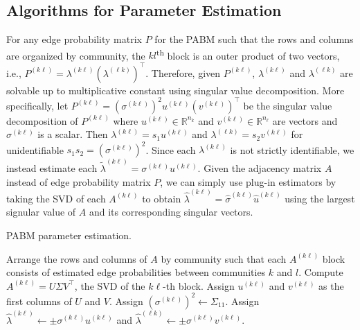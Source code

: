\documentclass[12pt]{article}
\begin{document}
\hypertarget{parameter-estimation}{%
\subsection{Algorithms for Parameter Estimation}\label{parameter-estimation}}

For any edge probability matrix \(P\) for the PABM such that the rows
and columns are organized by community, the \(kl\)\textsuperscript{th}
block is an outer product of two vectors, i.e.,
\(P^{(k \ell)} = \lambda^{(k \ell)} (\lambda^{(\ell k)})^\top\). Therefore, given
\(P^{(k \ell)}\), \(\lambda^{(k \ell)}\) and \(\lambda^{(\ell k)}\) are solvable
up to multiplicative constant using singular value
decomposition. More specifically, 
let \(P^{(k \ell)} = (\sigma^{(k \ell)})^2 u^{(k \ell)} (v^{(k \ell)})^\top\)
be the singular value decomposition of \(P^{(k \ell)}\) where
\(u^{(k \ell)} \in \mathbb{R}^{n_k}\) and 
\(v^{(k \ell)} \in \mathbb{R}^{n_\ell}\) are vectors
and \(\sigma^{(k \ell)}\) is a scalar. 
Then \(\lambda^{(k \ell)} = s_1 u^{(k \ell)}\)
and \(\lambda^{(\ell k)} = s_2 v^{(k \ell)}\) 
for unidentifiable $s_1 s_2 = (\sigma^{(k \ell)})^2$.
Since each $\lambda^{(k \ell)}$ is not strictly identifiable,
we instead estimate each 
$\tilde{\lambda}^{(k \ell)} = \sigma^{(k \ell)} u^{(k \ell)}$. 
Given the adjacency matrix \(A\)
instead of edge probability matrix \(P\), we can simply use plug-in
estimators by taking the SVD of each $A^{(k \ell)}$ to obtain 
$\hat{\lambda}^{(k \ell)} = \hat{\sigma}^{(k \ell)} \hat{u}^{(k \ell)}$ 
using the largest signular value of $A$ and its corresponding singular vectors. 

\begin{algorithm}[t]
  \label{alg:param_est}
  \DontPrintSemicolon
  \SetAlgoLined
  \caption{PABM parameter estimation.}
  Arrange the rows and columns of $A$ by community such that each 
  $A^{(k \ell)}$ block consists of estimated edge probabilities between 
  communities $k$ and $l$.\;
   {
    Compute $A^{(k \ell)} = U \Sigma V^\top$, the SVD of the $k\ell$-th 
    block.\;
    Assign $u^{(k \ell)}$ and $v^{(k \ell)}$ as the first columns of $U$ and $V$. 
    Assign $(\sigma^{(k \ell)})^2 \leftarrow \Sigma_{11}$.\;
    Assign $\hat{\lambda}^{(k \ell)} \leftarrow \pm \sigma^{(k \ell)} u^{(k \ell)}$ and 
    $\hat{\lambda}^{(\ell k)} \leftarrow \pm \sigma^{(k \ell)} v^{(k \ell)}$.
  }
\end{algorithm}
\end{document}
